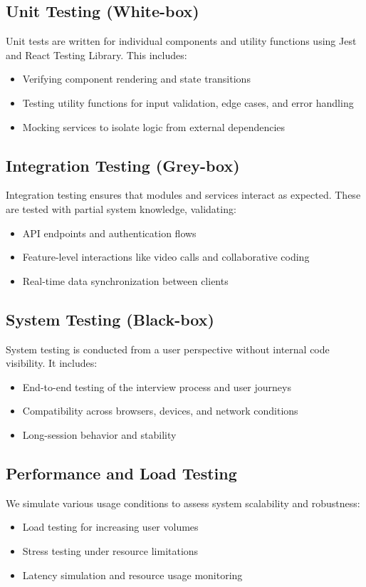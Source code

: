 \documentclass[12pt,a4paper]{report}
\begin{document}
\subsection{Unit Testing (White-box)}
Unit tests are written for individual components and utility functions using Jest and React Testing Library. This includes:
\begin{itemize}
    \item Verifying component rendering and state transitions
    \item Testing utility functions for input validation, edge cases, and error handling
    \item Mocking services to isolate logic from external dependencies
\end{itemize}

\subsection{Integration Testing (Grey-box)}
Integration testing ensures that modules and services interact as expected. These are tested with partial system knowledge, validating:
\begin{itemize}
    \item API endpoints and authentication flows
    \item Feature-level interactions like video calls and collaborative coding
    \item Real-time data synchronization between clients
\end{itemize}

\subsection{System Testing (Black-box)}
System testing is conducted from a user perspective without internal code visibility. It includes:
\begin{itemize}
    \item End-to-end testing of the interview process and user journeys
    \item Compatibility across browsers, devices, and network conditions
    \item Long-session behavior and stability
\end{itemize}

\subsection{Performance and Load Testing}
We simulate various usage conditions to assess system scalability and robustness:
\begin{itemize}
    \item Load testing for increasing user volumes
    \item Stress testing under resource limitations
    \item Latency simulation and resource usage monitoring
\end{itemize}
\end{document}
